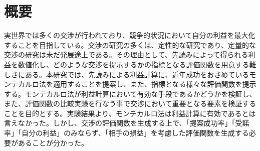 \documentclass[a4, 10pt,dvipdfmx]{jsarticle}
\begin{document}
\makecover


\tableofcontents

\newpage


\section*{概要} 



実世界では多くの交渉が行われており、競争的状況において自分の利益を最大化することを目指している。交渉の研究の多くは、定性的な研究であり、定量的な交渉の研究は未だ発展途上である。その理由として、先読みによって得られる利益を数値化し、どのような交渉を提示するかの指標となる評価関数を用意する難しさにある。本研究では、先読みによる利益計算に、近年成功をおさめているモンテカルロ法を適用することを提案し、また、指標となる様々な評価関数を提示する。モンテカルロ法が利益計算において有効な手段であるかどうかを検証し、また、評価関数の比較実験を行なう事で交渉において重要となる要素を検証することを目的とする。実験結果より、モンテカルロ法は利益計算に有効であるとは言えなかった。しかし、交渉の評価関数を生成する上で、「提案成功率」「受諾率」「自分の利益」のみならず、「相手の損益」を考慮した評価関数を生成する必要があることが分かった。


\end{document}
